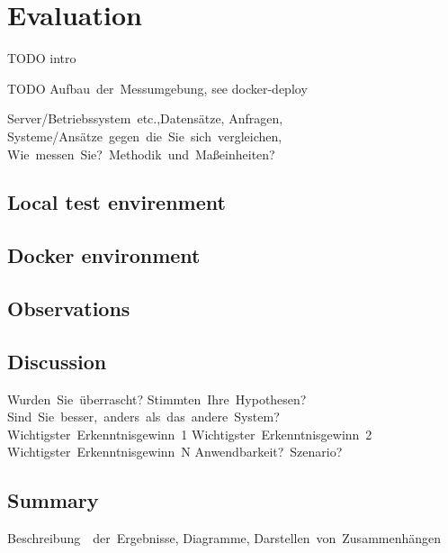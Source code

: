 \chapter{Evaluation}

TODO intro

TODO Aufbau der Messumgebung, see docker-deploy

Server/Betriebssystem etc.,Datensätze,
Anfragen, Systeme/Ansätze gegen die Sie sich vergleichen,
Wie messen Sie? Methodik und Maßeinheiten?

\section{Local test envirenment}

\section{Docker environment}

\section{Observations}

\section{Discussion}

Wurden Sie überrascht? Stimmten Ihre Hypothesen? Sind Sie besser, anders als das andere System?
Wichtigster Erkenntnisgewinn 1
Wichtigster Erkenntnisgewinn 2
Wichtigster Erkenntnisgewinn N
Anwendbarkeit? Szenario?

\section{Summary}

Beschreibung  der Ergebnisse, Diagramme, Darstellen von Zusammenhängen